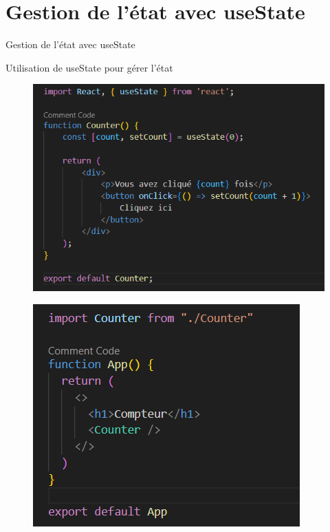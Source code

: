 \documentclass{clbeamer2024}
\begin{document}
	
	\section{Gestion de l'état avec useState}
	\begin{frame}{Gestion de l'état avec useState}
		\begin{exampleblock}{Utilisation de useState pour gérer l'état}
			
			\begin{figure}[h] %
				\centering
				\begin{minipage}{0.45\textwidth}
					\centering
					\includegraphics[width=\linewidth]{images/code3.png}
					\label{fig:image1}
				\end{minipage}
				\hfill %
				\begin{minipage}{0.4\textwidth}
					\centering
					\includegraphics[width=\linewidth]{images/code4.png}

\end{minipage}
\end{figure}
\end{exampleblock}
\end{frame}
\end{document}
